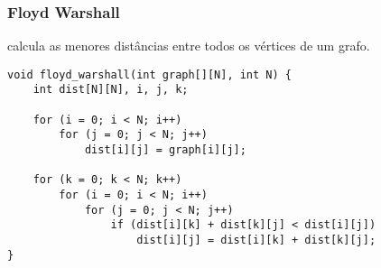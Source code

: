 \subsubsection{Floyd Warshall} calcula as menores distâncias entre todos os vértices de um grafo.
    \begin{verbatim}
void floyd_warshall(int graph[][N], int N) {
    int dist[N][N], i, j, k;

    for (i = 0; i < N; i++)
        for (j = 0; j < N; j++)
            dist[i][j] = graph[i][j];

    for (k = 0; k < N; k++) 
        for (i = 0; i < N; i++) 
            for (j = 0; j < N; j++) 
                if (dist[i][k] + dist[k][j] < dist[i][j])
                    dist[i][j] = dist[i][k] + dist[k][j];
}
    \end{verbatim}
\pagebreak
